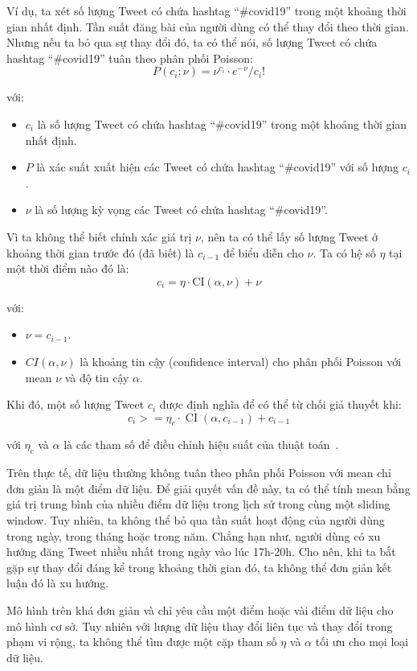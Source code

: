 Ví dụ, ta xét số lượng Tweet có chứa hashtag ``\#covid19'' trong một khoảng thời
gian nhất định. Tần suất đăng bài của người dùng có thể thay đổi theo thời
gian. Nhưng nếu ta bỏ qua sự thay đổi đó, ta có thể nói, số lượng Tweet có chứa
hashtag ``\#covid19'' tuân theo phân phối Poisson:
\[ P\left(c_{i} ; \nu\right)=\nu^{c_{i}} \cdot e^{-\nu} / c_{i} ! \]

với:
\begin{itemize}
	\item $c_{i}$ là số lượng Tweet có chứa hashtag ``\#covid19'' trong một khoảng
	thời gian nhất định.
	\item $P$ là xác suất xuất hiện các Tweet có chứa hashtag ``\#covid19'' với số
	lượng $c_{i}$.
	\item $\nu$ là số lượng kỳ vọng các Tweet có chứa hashtag ``\#covid19''.
\end{itemize}

Vì ta không thể biết chính xác giá trị $\nu$, nên ta có thể lấy số lượng Tweet ở
khoảng thời gian trước đó (đã biết) là $c_{i - 1}$ để biểu diễn cho $\nu$. Ta có
hệ số $\eta$ tại một thời điểm nào đó là:
\[ c_{i}=\eta \cdot \mathrm{CI}(\alpha, \nu)+\nu \]

với:
\begin{itemize}
	\item $\nu=c_{i-1}$.
	\item $CI(\alpha, \nu)$ là khoảng tin cậy (confidence interval) cho phân
	phối Poisson với mean $\nu$ và độ tin cậy $\alpha$.
\end{itemize}

Khi đó, một số lượng Tweet $c_{i}$ được định nghĩa để có thể từ chối giả thuyết
khi:
\[
	c_{i}>=\eta_{c} \cdot \operatorname{CI}\left(\alpha, c_{i-1}\right)+c_{i-1}
\]

với $\eta_{c}$ và $\alpha$ là các tham số để điều chỉnh hiệu suất của thuật
toán~\cite{hendricksonTrendDetectionSocial2015}.

Trên thực tế, dữ liệu thường không tuân theo phân phối Poisson với mean chỉ đơn
giản là một điểm dữ liệu. Để giải quyết vấn đề này, ta có thể tính mean bằng
giá trị trung bình của nhiều điểm dữ liệu trong lịch sử trong cùng một sliding
window. Tuy nhiên, ta không thể bỏ qua tần suất hoạt động của người dùng trong
ngày, trong tháng hoặc trong năm. Chẳng hạn như, người dùng có xu hướng đăng
Tweet nhiều nhất trong ngày vào lúc 17h-20h. Cho nên, khi ta bắt gặp sự thay
đổi đáng kể trong khoảng thời gian đó, ta không thể đơn giản kết luận đó là xu
hướng.

Mô hình trên khá đơn giản và chỉ yêu cầu một điểm hoặc vài điểm dữ liệu cho mô
hình cơ sở. Tuy nhiên với lượng dữ liệu thay đổi liên tục và thay đổi trong
phạm vi rộng, ta không thể tìm được một cặp tham số $\eta$ và $\alpha$ tối ưu
cho mọi loại dữ liệu.

